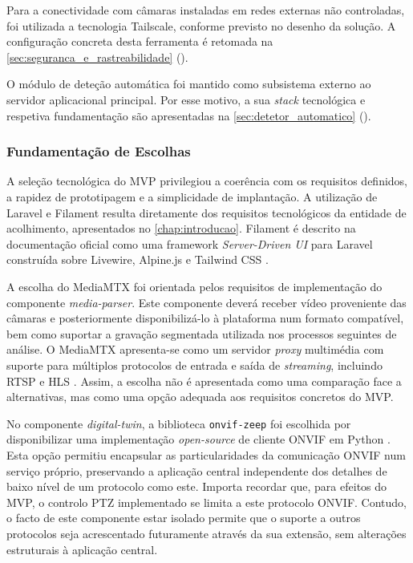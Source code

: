Para a conectividade com câmaras instaladas em redes externas não controladas, foi utilizada a tecnologia Tailscale, conforme previsto no desenho da solução. A configuração concreta desta ferramenta é retomada na \autoref{sec:seguranca_e_rastreabilidade} ().

O módulo de deteção automática foi mantido como subsistema externo ao servidor aplicacional principal. Por esse motivo, a sua \textit{stack} tecnológica e respetiva fundamentação são apresentadas na \autoref{sec:detetor_automatico} ().

\subsubsection{Fundamentação de Escolhas}

A seleção tecnológica do \gls{MVP} privilegiou a coerência com os requisitos definidos, a rapidez de prototipagem e a simplicidade de implantação. A utilização de Laravel e Filament resulta diretamente dos requisitos tecnológicos da entidade de acolhimento, apresentados no \autoref{chap:introducao}. Filament é descrito na documentação oficial como uma framework \textit{Server-Driven UI} para Laravel construída sobre Livewire, Alpine.js e Tailwind CSS \cite{filament_overview}.

A escolha do MediaMTX foi orientada pelos requisitos de implementação do componente \textit{media-parser}. Este componente deverá receber vídeo proveniente das câmaras e posteriormente disponibilizá-lo à plataforma num formato compatível, bem como suportar a gravação segmentada utilizada nos processos seguintes de análise. O MediaMTX apresenta-se como um servidor  \textit{proxy} multimédia com suporte para múltiplos protocolos de entrada e saída de \textit{streaming}, incluindo \gls{RTSP} e \gls{HLS} \cite{mediamtx_intro}. Assim, a escolha não é apresentada como uma comparação face a alternativas, mas como uma opção adequada aos requisitos concretos do \gls{MVP}.

No componente \textit{digital-twin}, a biblioteca \texttt{onvif-zeep} foi escolhida por disponibilizar uma implementação \textit{open-source} de cliente \gls{ONVIF} em Python \cite{onvif_zeep}. Esta opção permitiu encapsular as particularidades da comunicação \gls{ONVIF} num serviço próprio, preservando a aplicação central independente dos detalhes de baixo nível de um protocolo como este. Importa recordar que, para efeitos do \gls{MVP}, o controlo \gls{PTZ} implementado se limita a este protocolo \gls{ONVIF}. Contudo, o facto de este componente estar isolado permite que o suporte a outros protocolos seja acrescentado futuramente através da sua extensão, sem alterações estruturais à aplicação central.

